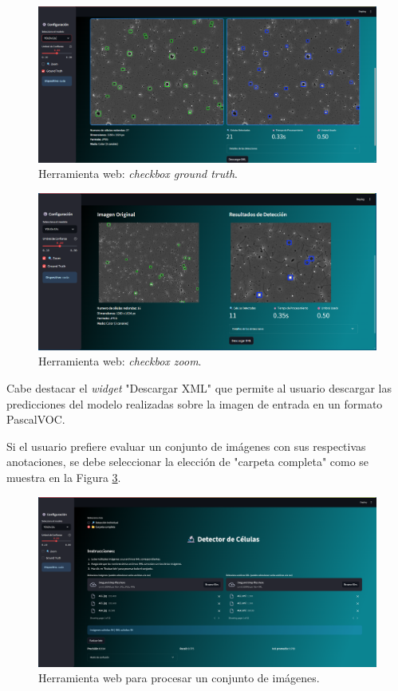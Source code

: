\documentclass[12pt,a4paper,onecolumn,oneside]{report}
\begin{document}
\begin{figure}[htbp]
  \centering
  \includegraphics[width=1.0\textwidth]{figuras/app/prueba_imagen.png}
  \caption{Herramienta web: \textit{checkbox ground truth}.}
  \label{fig:cell_app_gt}
\end{figure}

\begin{figure}[htbp]
  \centering
  \includegraphics[width=1.0\textwidth]{figuras/app/zoom_imagen.png}
  \caption{Herramienta web: \textit{checkbox zoom}.}
  \label{fig:cell_app_zoom}
\end{figure}

Cabe destacar el \textit{widget} "Descargar XML" que permite al usuario descargar las predicciones del modelo realizadas sobre la imagen de entrada en un formato
PascalVOC. 

Si el usuario prefiere evaluar un conjunto de imágenes con sus respectivas anotaciones, se debe seleccionar la elección de "carpeta completa" como se muestra en la Figura \ref{fig:cell_app_directory}.

\begin{figure}[htbp]
  \centering
  \includegraphics[width=1.0\textwidth]{figuras/app/cell_app_directorio.png}
  \caption{Herramienta web para procesar un conjunto de imágenes.}
  \label{fig:cell_app_directory}
\end{figure}
\end{document}
